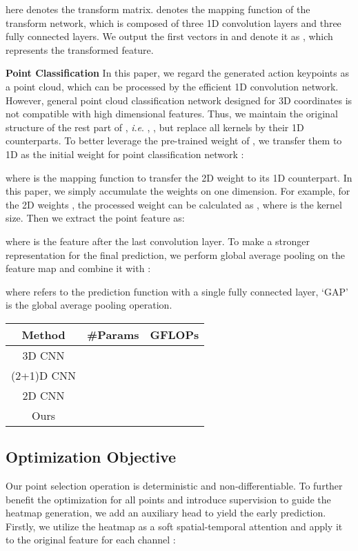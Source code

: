 \documentclass[journal]{IEEEtran}
\newcommand{\ie}{\textit{i}.\textit{e}. }
\begin{document}
here  denotes the transform matrix.
 denotes the mapping function of the transform network, which is composed of three 1D convolution layers and three fully connected layers.
We output the first  vectors in  and denote it as , which represents the transformed feature.

\textbf{Point Classification}
In this paper, we regard the generated action keypoints as a point cloud, which can be processed by the efficient 1D convolution network.
However, general point cloud classification network designed for 3D coordinates is not compatible with high dimensional features.
Thus, we maintain the original structure of the rest part of , \ie, , but replace all kernels by their 1D counterparts.
To better leverage the pre-trained weight of , we transfer them to 1D as the initial weight for point classification network :

where  is the mapping function to transfer the 2D weight to its 1D counterpart.
In this paper, we simply accumulate the weights on one dimension.
For example, for the 2D weights , the processed weight  can be calculated as , where  is the kernel size.
Then we extract the point feature as:

where  is the feature after the last convolution layer.
To make a stronger representation for the final prediction, we perform global average pooling on the feature map  and combine it with :

where  refers to the prediction function with a single fully connected layer, `GAP' is the global average pooling operation.

\begin{table*}[ht]
	\centering
	\caption{The number of parameters and computational cost of different operations.  and  is the spatial and temporal size of convolutional kernels, respectively.  is the size of the 1D convolution. They are generally set as a small number in networks, \ie, 3 or 1.}
	\label{tab:comp_show}
	\begin{tabular}{ccc}
		\hline
		\textbf{Method}  & \textbf{\#Param}s & \textbf{GFLOPs} \\ \hline
		3D CNN  &     &     \\
		(2+1)D CNN &     &     \\
		2D CNN      &     &     \\ \hline
		Ours    &     &    \\ \hline
	\end{tabular}
\end{table*}

\subsection{Optimization Objective}
Our point selection operation is deterministic and non-differentiable.
To further benefit the optimization for all points and introduce supervision to guide the heatmap generation, we add an auxiliary head to yield the early prediction.
Firstly, we utilize the heatmap as a soft spatial-temporal attention and apply it to the original feature  for each channel :
\end{document}
